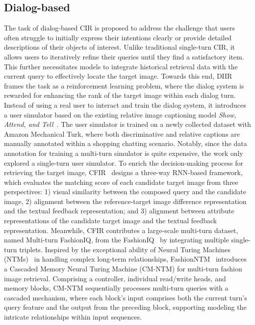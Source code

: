 \subsection{Dialog-based} 
The task of dialog-based CIR is proposed to address the challenge that users often struggle to initially express their intentions clearly or provide detailed descriptions of their objects of interest. Unlike traditional single-turn CIR, it allows users to iteratively refine their queries until they find a satisfactory item. This further necessitates models to integrate historical retrieval data with the current query to effectively locate the target image. 
Towards this end, DIIR~\cite{guo2018dialog} frames the task as a reinforcement learning problem, where the dialog system is rewarded for enhancing the rank of the target image within each dialog turn. Instead of using a real user to interact and train the dialog system, it introduces a user simulator based on the existing relative image captioning model \textit{Show, Attend, and Tell}~\cite{xu2015show}. The user simulator is trained on a newly collected dataset with Amazon Mechanical Turk, where both discriminative and relative captions are manually annotated within a shopping chatting scenario. Notably, since the data annotation for training a multi-turn simulator is quite expensive, the work only explored a single-turn user simulator. 
To enrich the decision-making process for retrieving the target image, CFIR~\cite{cfir2021} designs a three-way RNN-based framework, which evaluates the matching score of each candidate target image from three perspectives: 1) visual similarity between the composed query and the candidate image, 2) alignment between the reference-target image difference representation and the textual feedback representation; and 3) alignment between attribute representations of the candidate target image and the textual feedback representation. 
Meanwhile, CFIR contributes a large-scale multi-turn dataset, named Multi-turn FashionIQ, from the FashionIQ~\cite{wu2021fiq} by integrating multiple single-turn triplets. 
Inspired by the exceptional ability of Neural Turing Machines (NTMs)~\cite{graves2014neural} in handling complex long-term relationships, FashionNTM~\cite{fashionntm} introduces a Cascaded Memory Neural Turing Machine (CM-NTM) for multi-turn fashion image retrieval. Comprising a controller, individual read/write heads, and memory blocks, CM-NTM sequentially processes multi-turn queries with a cascaded mechanism, where each block's input comprises both the current turn's query feature and the output from the preceding block, supporting modeling the intricate relationships within input sequences. 
